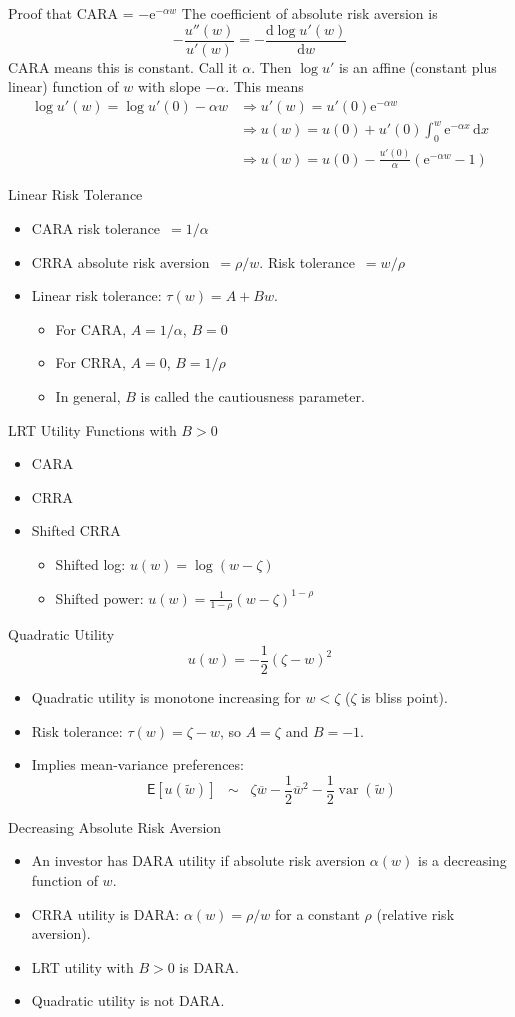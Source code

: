 \documentclass[10pt]{beamer}
\DeclareMathOperator{\var}{var}
\newcommand{\bi}{\begin{itemize}}
\newcommand{\ei}{\end{itemize}}
\newcommand{\im}{\item}
\newcommand{\D}{\mathrm{d}}
\newcommand{\E}{\mathrm{e}}
\newcommand{\mye}{\ensuremath{\mathsf{E}}}
\begin{document}
\begin{frame}{Proof that CARA = $-\E^{-\alpha w}$}
 The coefficient of absolute risk aversion is
 $$-\frac{u''(w)}{u'(w)} = - \frac{\D \log u'(w)}{\D w}$$
 CARA means this is constant.  Call it $\alpha$. Then $\log u'$
 is an affine (constant plus linear) function of $w$ with slope $-\alpha$.  This means
\begin{align*}
    \log u'(w) = \log u'(0) - \alpha w &\Rightarrow u'(w) = u'(0)\E^{-\alpha w}\\
& \Rightarrow u(w) = u(0) + u'(0)\int_0^w \E^{-\alpha x}\,\D x\\
& \Rightarrow u(w) = u(0) - \frac{u'(0)}{\alpha} \left(\E^{-\alpha w} - 1\right)
\end{align*}
\end{frame}

\begin{frame}{Linear Risk Tolerance}
  \bi
  \im CARA risk tolerance $\,= 1/\alpha$
  \im CRRA absolute risk aversion $\,= \rho/w$.  Risk tolerance $\,= w/\rho$
  \im Linear risk tolerance: $\tau(w) = A + B w$.
  \bi
  \im For CARA, $A=1/\alpha$, $B=0$
  \im For CRRA, $A=0$, $B = 1/\rho$
  \im In general, $B$ is called the cautiousness parameter.
  \ei
  \ei
  \end{frame}
  
  \begin{frame}{LRT Utility Functions with $B>0$}
  \bi
  \im CARA
  \im CRRA
  \im Shifted CRRA
  \bi
  \im Shifted log: $u(w) = \log (w-\zeta)$
  \im Shifted power: $u(w) = \frac{1}{1-\rho}(w-\zeta)^{1-\rho}$
  \ei
  \ei
  \end{frame}

  \begin{frame}{Quadratic Utility}
   $$u(w) = -\frac{1 }{2}\left(\zeta-w\right)^2$$ 
  \bi
  \im Quadratic utility is monotone increasing for $w<\zeta$ ($\zeta$ is bliss point).
  \im Risk tolerance: $\tau(w) = \zeta-w$, so $A=\zeta$ and $B=-1$.   
  \im Implies mean-variance preferences:
  $$\mye[u(\tilde{w})] \;\;\sim  \;\;\zeta \overline{w} - \frac{1}{2}\overline{w}^2 - \frac{1}{2}\var(\widetilde{w})$$
  \ei
  \end{frame}

  \begin{frame}{Decreasing Absolute Risk Aversion}
    \bi
    \im An investor has DARA utility if absolute risk aversion $\alpha(w)$ is a decreasing function of $w$.
    \im CRRA utility is DARA: $\alpha(w) = \rho/w$ for a constant $\rho$ (relative risk aversion).
    \im LRT utility with $B>0$ is DARA.
    \im Quadratic utility is not DARA.
    \ei
  \end{frame}
\end{document}
